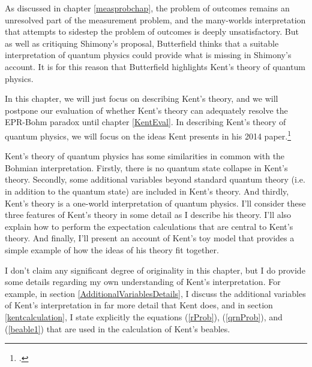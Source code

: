 \documentclass[12pt]{report}
\begin{document}
As discussed in chapter \ref{measprobchap}, the problem of outcomes remains an unresolved part of the measurement problem, and the many-worlds interpretation that attempts to sidestep the problem of outcomes is deeply unsatisfactory. But as well as critiquing Shimony's proposal, Butterfield thinks that a suitable interpretation of quantum physics could provide what is missing in Shimony's account. It is for this reason that Butterfield highlights Kent's theory of quantum physics.

In this chapter, we will just focus on describing Kent's theory, and we will postpone our evaluation of whether Kent's theory can adequately resolve the EPR-Bohm paradox until chapter \ref{KentEval}. In describing Kent's theory of quantum physics, we will focus on the ideas Kent presents in his 2014 paper.\footnote{\cite{Kent2014}.} 
 
Kent's theory of quantum physics has some similarities in common with the Bohmian interpretation. Firstly,  there is no quantum state collapse in Kent's theory. Secondly, some additional variables beyond standard quantum theory (i.e. in addition to the quantum state) are included in Kent's theory. And thirdly, Kent's theory is a one-world interpretation of quantum physics. I'll consider these three features of Kent's theory in some detail as I describe his theory. I'll also explain how to perform the expectation calculations that are central to Kent's theory. And finally, I'll present an account of Kent's toy model that provides a simple example of how the ideas of his theory fit together. 

I don't claim any significant degree of originality in this chapter, but I do provide some details regarding my own understanding of Kent's interpretation. For example, in section \ref{AdditionalVariablesDetails}, I discuss the additional variables of Kent's interpretation in far more detail that Kent does, and in section \ref{kentcalculation}, I state explicitly the equations (\ref{rProb}), (\ref{qrnProb}), and (\ref{beable1}) that are used in the calculation of Kent's beables.


\end{document}
